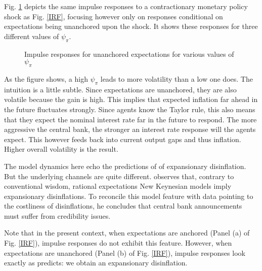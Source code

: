 \documentclass[11pt]{article}
\def \myFigPath {../../figures/}
\renewcommand{\[}{\begin{equation}}
\renewcommand{\]}{\end{equation}}
\def\fignameIRFpsipiSmall{command_IFS_anchoring_pretty_RIR_LH_unanch_monpol_again_critCUSUM_constant_only_T_400_N_1000_burnin_5_params_psi_pi_1_01_psi_x_0_gbar_0_145_thetbar_16_thettilde_2_5_kap_0_8_lamx_0_lami_0_date_2020_06_05}
\def\fignameIRFpsipiMedium{command_IFS_anchoring_pretty_RIR_LH_unanch_monpol_again_critCUSUM_constant_only_T_400_N_1000_burnin_5_params_psi_pi_1_5_psi_x_0_gbar_0_145_thetbar_16_thettilde_2_5_kap_0_8_lamx_0_lami_0_date_2020_06_05}
\def\fignameIRFpsipiBig{command_IFS_anchoring_pretty_RIR_LH_unanch_monpol_again_critCUSUM_constant_only_T_400_N_1000_burnin_5_params_psi_pi_2_psi_x_0_gbar_0_145_thetbar_16_thettilde_2_5_kap_0_8_lamx_0_lami_0_date_2020_06_05}
\begin{document}
Fig. \ref{IRF_unanchored_psi} depicts the same impulse responses to a contractionary monetary policy shock as Fig. \ref{IRF}, focusing however only on responses conditional on expectations being unanchored upon the shock. It shows these responses for three different values of $\psi_{\pi}$.
\begin{figure}[h!]
\caption{Impulse responses for unanchored expectations for various values of $\psi_{\pi}$}
\label{IRF_unanchored_psi}
\end{figure}
As the figure shows, a high $\psi_{\pi}$ leads to more volatility than a low one does. The intuition is a little subtle. Since expectations are unanchored, they are also volatile because the gain is high. This implies that expected inflation far ahead in the future fluctuates strongly. Since agents know the Taylor rule, this also means that they expect the nominal interest rate far in the future to respond. The more aggressive the central bank, the stronger an interest rate response will the agents expect. This however feeds back into current output gaps and thus inflation. Higher overall volatility is the result.

The model dynamics here echo the predictions of \cite{ball1994credible} of expansionary disinflation. But the underlying channels are quite different. \cite{ball1994credible} observes that, contrary to conventional wisdom, rational expectations New Keynesian models imply expansionary disinflations. To reconcile this model feature with data pointing to the costliness of disinflations, he concludes that central bank announcements must suffer from credibility issues. 

Note that in the present context, when expectations are anchored (Panel (a) of Fig. \ref{IRF}), impulse responses do not exhibit this feature. However, when expectations are unanchored (Panel (b) of Fig. \ref{IRF}), impulse responses look exactly as \cite{ball1994credible} predicts: we obtain an expansionary disinflation. 
\end{document}
